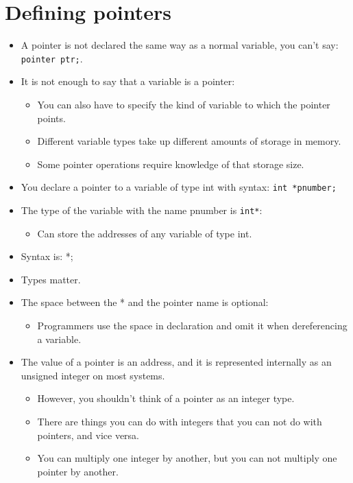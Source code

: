 \section{Defining pointers}
\begin{itemize}
    \item A pointer is not declared the same way as a normal variable, you can't say: \verb|pointer ptr;|.
    \item It is not enough to say that a variable is a pointer: 
        \begin{itemize}
            \item You can also have to specify the kind of variable to which the pointer points. 
            \item Different variable types take up different amounts of storage in memory. 
            \item Some pointer operations require knowledge of that storage size. 
        \end{itemize}
    
    \item You declare a pointer to a variable of type int with syntax: \verb|int *pnumber;|
    \item The type of the variable with the name pnumber is \verb|int*|:
        \begin{itemize}
            \item Can store the addresses of any variable of type int. 
        \end{itemize}
    \item Syntax is:  *;
    \item Types matter.
    \item The space between the * and the pointer name is optional:
        \begin{itemize}
            \item Programmers use the space in declaration and omit it when dereferencing a variable. 
        \end{itemize}
    
    \item The value of a pointer is an address, and it is represented internally as an unsigned integer on most systems. 
        \begin{itemize}
            \item However, you shouldn't think of a pointer as an integer type. 
            \item There are things you can do with integers that you can not do with pointers, and vice versa.
            \item You can multiply one integer by another, but you can not multiply one pointer by another. 
        \end{itemize}
    

\end{itemize}
